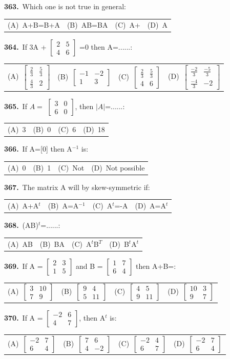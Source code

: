 \documentclass[11pt,a4paper]{article}
\makeatletter
\newcommand{\mcq}[6]{%
  \Needspace{4\baselineskip}%
  \par\medskip\noindent\textbf{#1.}\ #2\par\nopagebreak
  \noindent\begin{tabularx}{\linewidth}{@{\hspace{1.5em}}*{4}{>{\raggedright\arraybackslash}X}@{}}
    (A)~#3 & (B)~#4 & (C)~#5 & (D)~#6
  \end{tabularx}\par}
\makeatother
\begin{document}
\mcq{363}{Which one is not true in general:}{A+B=B+A}{AB=BA}{A+}{A}
\mcq{364}{If 3A + $\begin{bmatrix}2&5\\4&6\end{bmatrix}$ =0 then A=......:}{$\begin{bmatrix}\frac{2}{3}&\frac{5}{3}\\\frac{4}{3}&2\end{bmatrix}$}{$\begin{bmatrix}-1&-2\\1&3\end{bmatrix}$}{$\begin{bmatrix}\frac{2}{3}&\frac{5}{3}\\4&6\end{bmatrix}$}{$\begin{bmatrix}\frac{-2}{3}&\frac{-5}{3}\\\frac{-4}{3}&-2\end{bmatrix}$}
\mcq{365}{If $A=$ $\begin{bmatrix}3&0\\6&0\end{bmatrix}$, then $|A|$=......:}{3}{0}{6}{18}
\mcq{366}{If A=[0] then A$^{-1}$ is:}{0}{1}{Not}{Not possible}
\mcq{367}{The matrix A will by skew-symmetric if:}{A+A$^{t}$}{A=A$^{-1}$}{A$^{t}$=-A}{A=A$^{t}$}
\mcq{368}{(AB)$^{t}$=......:}{AB}{BA}{A$^{t}$B$^{T}$}{B$^{t}$A$^{t}$}
\mcq{369}{If A = $\begin{bmatrix}2&3\\1&5\end{bmatrix}$ and B = $\begin{bmatrix}1&7\\6&4\end{bmatrix}$ then A+B=:}{$\begin{bmatrix}3&10\\7&9\end{bmatrix}$}{$\begin{bmatrix}9&4\\5&11\end{bmatrix}$}{$\begin{bmatrix}4&5\\9&11\end{bmatrix}$}{$\begin{bmatrix}10&3\\9&7\end{bmatrix}$}
\mcq{370}{If A = $\begin{bmatrix}-2&6\\4&7\end{bmatrix}$, then A$^{t}$ is:}{$\begin{bmatrix}-2&7\\6&4\end{bmatrix}$}{$\begin{bmatrix}7&6\\4&-2\end{bmatrix}$}{$\begin{bmatrix}-2&4\\6&7\end{bmatrix}$}{$\begin{bmatrix}-2&7\\6&4\end{bmatrix}$}
\end{document}
